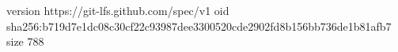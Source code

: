 version https://git-lfs.github.com/spec/v1
oid sha256:b719d7e1dc08c30cf22c93987dee3300520cde2902fd8b156bb736de1b81afb7
size 788
